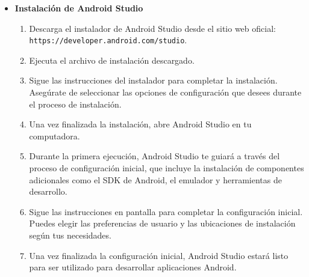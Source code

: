 \documentclass{article}
\begin{document}
    \begin{itemize}
        \item \textbf{Instalación de Android Studio}
        
            \begin{enumerate}
                \item Descarga el instalador de Android Studio desde el sitio web oficial: \texttt{https://developer.android.com/studio}.
                \item Ejecuta el archivo de instalación descargado.
                \item Sigue las instrucciones del instalador para completar la instalación. Asegúrate de seleccionar las opciones de configuración que desees durante el proceso de instalación.
                \item Una vez finalizada la instalación, abre Android Studio en tu computadora.
                \item Durante la primera ejecución, Android Studio te guiará a través del proceso de configuración inicial, que incluye la instalación de componentes adicionales como el SDK de Android, el emulador y herramientas de desarrollo.
                \item Sigue las instrucciones en pantalla para completar la configuración inicial. Puedes elegir las preferencias de usuario y las ubicaciones de instalación según tus necesidades.
                \item Una vez finalizada la configuración inicial, Android Studio estará listo para ser utilizado para desarrollar aplicaciones Android.
            \end{enumerate}
    

\end{itemize}
\end{document}
